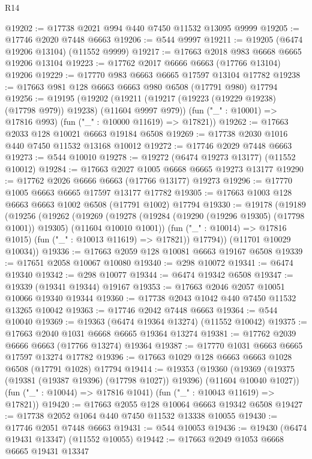 \begin{lexlean}{R14}
\begin{coremodule}
{{{{{{{{{{{{{{{{{{{{{{{{{{{{{{{{{{{{{{{{{{{{{{{{{{{{{{{{{{{{{{{{{{{{{{{{{{{{{{{{{{@19202 := @17738 @2021 @994 @440 @7450 @11532 @13095 @9999
@19205 := @17746 @2020 @7448 @6663
@19206 := @544 @9997
@19211 := @19205 (@6474 @19206 @13104) (@11552 @9999)
@19217 := @17663 @2018 @983 @6668 @6665 @19206 @13104
@19223 := @17762 @2017 @6666 @6663 (@17766 @13104) @19206
@19229 := @17770 @983 @6663 @6665 @17597 @13104 @17782
@19238 := @17663 @981 @128 @6663 @6663 @980 @6508 (@17791 @980) @17794
@19256 := @19195
    (@19202
      (@19211 (@19217 (@19223 (@19229 @19238) (@17798 @979)) @19238) (@11604 @9997 @979))
      (fun ("_" : @10001) => @17816 @993)
      (fun ("_" : @10000 @11619) => @17821))
@19262 := @17663 @2033 @128 @10021 @6663 @19184 @6508
@19269 := @17738 @2030 @1016 @440 @7450 @11532 @13168 @10012
@19272 := @17746 @2029 @7448 @6663
@19273 := @544 @10010
@19278 := @19272 (@6474 @19273 @13177) (@11552 @10012)
@19284 := @17663 @2027 @1005 @6668 @6665 @19273 @13177
@19290 := @17762 @2026 @6666 @6663 (@17766 @13177) @19273
@19296 := @17770 @1005 @6663 @6665 @17597 @13177 @17782
@19305 := @17663 @1003 @128 @6663 @6663 @1002 @6508 (@17791 @1002) @17794
@19330 := @19178
    (@19189
      (@19256
        (@19262
          (@19269
            (@19278 (@19284 (@19290 (@19296 @19305) (@17798 @1001)) @19305) (@11604 @10010 @1001))
            (fun ("_" : @10014) => @17816 @1015)
            (fun ("_" : @10013 @11619) => @17821))
          @17794))
      (@11701 @10029 @10034))
@19336 := @17663 @2059 @128 @10081 @6663 @19167 @6508
@19339 := @17651 @2058 @10067 @10080
@19340 := @298 @10072
@19341 := @6474 @19340
@19342 := @298 @10077
@19344 := @6474 @19342 @6508
@19347 := @19339 (@19341 @19344) @19167
@19353 := @17663 @2046 @2057 @10051 @10066 @19340 @19344
@19360 := @17738 @2043 @1042 @440 @7450 @11532 @13265 @10042
@19363 := @17746 @2042 @7448 @6663
@19364 := @544 @10040
@19369 := @19363 (@6474 @19364 @13274) (@11552 @10042)
@19375 := @17663 @2040 @1031 @6668 @6665 @19364 @13274
@19381 := @17762 @2039 @6666 @6663 (@17766 @13274) @19364
@19387 := @17770 @1031 @6663 @6665 @17597 @13274 @17782
@19396 := @17663 @1029 @128 @6663 @6663 @1028 @6508 (@17791 @1028) @17794
@19414 := @19353
    (@19360
      (@19369 (@19375 (@19381 (@19387 @19396) (@17798 @1027)) @19396) (@11604 @10040 @1027))
      (fun ("_" : @10044) => @17816 @1041)
      (fun ("_" : @10043 @11619) => @17821))
@19420 := @17663 @2055 @128 @10064 @6663 @19342 @6508
@19427 := @17738 @2052 @1064 @440 @7450 @11532 @13338 @10055
@19430 := @17746 @2051 @7448 @6663
@19431 := @544 @10053
@19436 := @19430 (@6474 @19431 @13347) (@11552 @10055)
@19442 := @17663 @2049 @1053 @6668 @6665 @19431 @13347
}}}}}}}}}}}}}}}}}}}}}}}}}}}}}}}}}}}}}}}}}}}}}}}}}}}}}}}}}}}}}}}}}}}}}}}}}}}}}}}}}}
\end{coremodule}
\end{lexlean}
